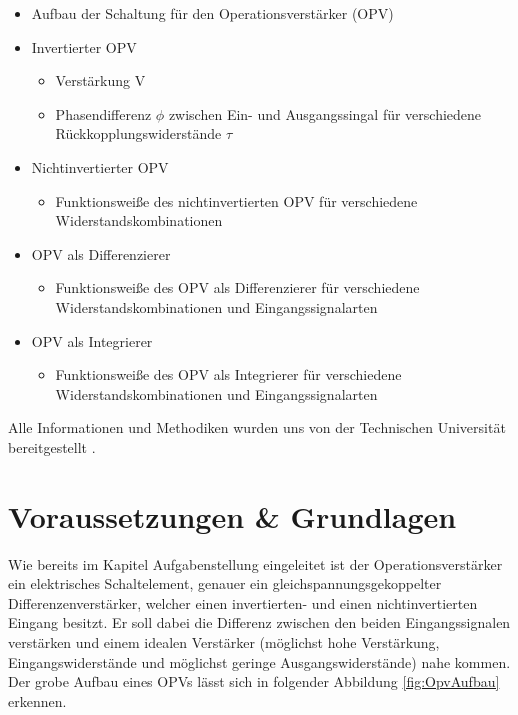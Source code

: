 \documentclass[12pt,a4paper,twoside]{article}
\begin{document}
\begin{itemize}
    \item Aufbau der Schaltung für den Operationsverstärker (OPV)
    \item Invertierter OPV
    \begin{itemize}
        \item Verstärkung V 
        \item Phasendifferenz $\phi$ zwischen Ein- und Ausgangssingal für verschiedene Rückkopplungswiderstände $\tau$
    \end{itemize}
    \item Nichtinvertierter OPV
    \begin{itemize}
        \item Funktionsweiße des nichtinvertierten OPV für verschiedene Widerstandskombinationen
    \end{itemize}
    \item OPV als Differenzierer
    \begin{itemize}
        \item Funktionsweiße des OPV als Differenzierer für verschiedene Widerstandskombinationen und Eingangssignalarten
    \end{itemize}
    \item OPV als Integrierer
    \begin{itemize}
        \item Funktionsweiße des OPV als Integrierer für verschiedene Widerstandskombinationen und Eingangssignalarten
    \end{itemize}
\end{itemize}

\noindent
Alle Informationen und Methodiken wurden uns von der Technischen Universität bereitgestellt \cite{teachcenter2}. 


\section{Voraussetzungen \& Grundlagen} %

Wie bereits im Kapitel Aufgabenstellung eingeleitet ist der Operationsverstärker ein elektrisches Schaltelement, genauer ein gleichspannungsgekoppelter Differenzenverstärker, welcher einen invertierten- und einen nichtinvertierten Eingang besitzt. Er soll dabei die Differenz zwischen den beiden Eingangssignalen verstärken und einem idealen Verstärker (möglichst hohe Verstärkung, Eingangswiderstände und möglichst geringe Ausgangswiderstände) nahe kommen. Der grobe Aufbau eines OPVs lässt sich in folgender Abbildung \ref{fig:OpvAufbau} erkennen.
\end{document}
